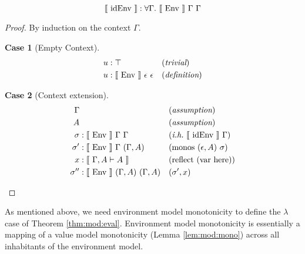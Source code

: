\documentclass{llncs}
\newtheorem{scase}{Case}
\newcommand{\refthm}[1]{Theorem \ref{thm:#1}}
\newcommand{\reflem}[1]{Lemma \ref{lem:#1}}
\def\lam{\lambda}
\def\emp{\epsilon}
\def\here{\con{here}}
\def\var{\con{var}}
\def\reflectn{\fun{reflect}}
\def\reflect{\reflectn}
\def\monos{\fun{monos}}
\def\midenv{\el{\fun{idEnv}}}
\def\bydef{(\textit{definition})}
\def\byass{(\textit{assumption})}
\def\bytri{(\textit{trivial})}
\newcommand{\ih}[1]{(\textit{i.h.}~ #1)}
\newcommand{\by}[1]{(#1)}
\newcommand{\all}[1]{\forall#1.~}
\newcommand{\el}[1]{\llbracket ~ #1 ~ \rrbracket}
\newcommand{\con}[1]{\textmd{#1}}
\newcommand{\fun}[1]{\textmd{#1}}
\newcommand{\gatypm}[1]{\el{\Gamma, A \vdash #1}}
\newcommand{\gmenv}[1]{\el{\fun{Env}}~\Gamma~#1}
\newcommand{\cmenv}[2]{\el{\fun{Env}}~#1~#2}
\begin{document}
\begin{theorem}
\label{thm:midenv}
$$
\midenv : \all{\Gamma} \gmenv{\Gamma}
$$

\begin{proof}
By induction on the context $\Gamma$.

\begin{scase}[Empty Context]
\begin{align*}
u &: \top && \bytri\\
u &: \cmenv{\emp}{\emp} && \bydef
\end{align*}
\end{scase}

\begin{scase}[Context extension]
\begin{align*}
\Gamma& && \byass\\
A& && \byass\\
\sigma  &: \cmenv{\Gamma}{\Gamma} && \ih{\midenv~\Gamma}\\
\sigma' &: \cmenv{\Gamma}{(\Gamma, A)} && \by{\monos~(\emp, A)~\sigma}\\
x    &: \gatypm{A} && \by{\reflect~(\var~\here)}\\
\sigma'' &: \cmenv{(\Gamma, A)}{(\Gamma, A)} && \by{\sigma', x}
\end{align*}
\end{scase}

\end{proof}

\end{theorem}


As mentioned above, we need environment model monotonicity
to define the $\lam$ case of \refthm{mod:eval}. Environment model
monotonicity is essentially a mapping of a value model
monotonicity (\reflem{mod:mono}) across all inhabitants of the
environment model.
\end{document}
